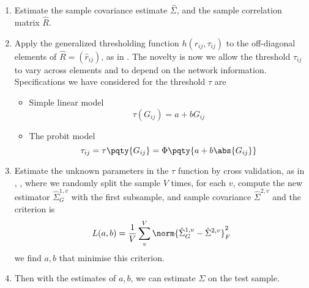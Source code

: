 \begin{enumerate}
    \item Estimate the sample covariance estimate \(\hat{\Sigma}\), and the sample correlation matrix \(\hat{R}\). 
    \item Apply the generalized thresholding function \(h(r_{ij},\tau_{ij})\) to the off-diagonal elements of \(\hat{R} = (\hat{r}_{ij})\), as in  \cite{rothman2009GeneralizedThresholding}. The novelty is now we allow the threshold \(\tau_{ij}\) to vary across elements and to depend on the network information.  Specifications we have considered for the threshold \(\tau\) are 
    \begin{itemize}
        \item Simple linear model 
            \begin{equation*}
                \tau(G_{ij}) = a + bG_{ij}
            \end{equation*}
        \item 
        The probit model
            \begin{equation*}
            \tau_{ij} = \tau\pqty{G_{ij}} = \Phi\pqty{a + b \abs{G_{ij}}}
            \end{equation*}
    \end{itemize}
    \item Estimate the unknown parameters in the \(\tau\) function by cross validation, as in \cite{bickel2008CovarianceRegularization}, \cite{cai2011AdaptiveThresholding}, where we randomly split the sample \(V\) times, for each \(v\), compute the new estimator \(\hat{\Sigma}^{1,v}_{G}\) with the first subsample, and sample covariance \(\hat{\Sigma}^{2,v}\) and the criterion is 
    \begin{equation*}
        L(a, b) = \frac{1}{V} \sum_{v}^{V} \norm{\hat{\Sigma}^{1,v}_{G} - \hat{\Sigma}^{2,v}}^{2}_{F}
    \end{equation*}
    we find \(a,b\) that minimise this criterion. 
    
    \item Then with the estimates of \(a,b\), we can estimate \(\Sigma\) on the test sample. 
\end{enumerate}


